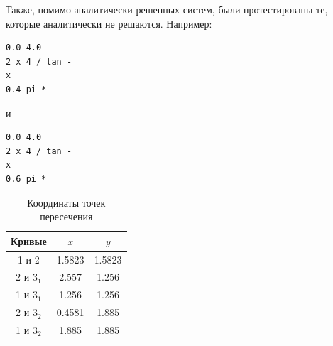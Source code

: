 \documentclass[a4paper,12pt,titlepage,finall]{article}
\begin{document}
\newpage
Также, помимо аналитически решенных систем, были протестированы те, которые аналитически не решаются. Например:
\begin{verbatim}
0.0 4.0
2 x 4 / tan -
x
0.4 pi *
\end{verbatim}
и
\begin{verbatim}
0.0 4.0
2 x 4 / tan -
x
0.6 pi *
\end{verbatim}
\begin{table}[h]
\centering
\begin{tabular}{|c|c|c|}
\hline
Кривые & $x$ & $y$ \\
\hline
1 и 2 &  1.5823 & 1.5823 \\
2 и $3_1$ &  2.557 & 1.256 \\
1 и $3_1$ & 1.256 & 1.256 \\
2 и $3_2$ &  0.4581 & 1.885 \\
1 и $3_2$ & 1.885 & 1.885 \\
\hline
\end{tabular}
\caption{Координаты точек пересечения}
\label{table1}
\end{table}
\end{document}
